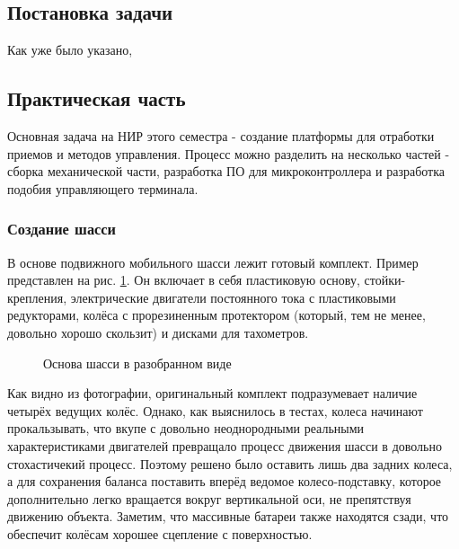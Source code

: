 \documentclass[14pt,a4paper,russian]{scrartcl}
\begin{document}
\subsection{Постановка задачи}
Как уже было указано, 
\newpage

\subsection{Практическая часть}
Основная задача на НИР этого семестра - создание платформы для отработки
приемов и методов управления. Процесс можно разделить на
несколько частей - сборка механической части, разработка ПО для микроконтроллера и 
разработка подобия управляющего терминала.
\subsubsection{Создание шасси}
В основе подвижного мобильного шасси лежит готовый комплект. Пример
представлен на рис. \ref{fig:shassis_dissassembled}. Он включает в себя пластиковую основу,
стойки-крепления, электрические двигатели постоянного тока с пластиковыми редукторами,
колёса с прорезиненным протектором (который, тем не менее, довольно хорошо скользит)
и дисками для тахометров.
\begin{figure}[h]
    \caption{Основа шасси в разобранном виде}
    \label{fig:shassis_dissassembled}
\end{figure}

Как видно из фотографии, оригинальный комплект подразумевает наличие четырёх
ведущих колёс. Однако, как выяснилось в тестах, колеса начинают прокальзывать,
что вкупе с довольно неоднородными реальными характеристиками двигателей
превращало процесс движения шасси в довольно стохастичекий процесс. Поэтому
решено было оставить лишь два задних колеса, а для сохранения баланса
поставить вперёд ведомое колесо-подставку, которое дополнительно
легко вращается вокруг вертикальной оси, не препятствуя движению объекта. Заметим,
что массивные батареи также находятся сзади, что обеспечит колёсам хорошее
сцепление с поверхностью.
\end{document}
